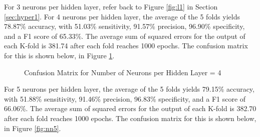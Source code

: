 \documentclass[tikz]{article}
\begin{document}
For 3 neurons per hidden layer, refer back to Figure \ref{fig:l1} in Section \ref{sec:hyper1}. For 4 neurons per hidden layer, the average of the 5 folds yields 78.87\% accuracy, with 51.03\% sensitivity, 91.57\% precision, 96.90\% specificity, and a F1 score of 65.33\%. The average sum of squared errors for the output of each K-fold is 381.74 after each fold reaches 1000 epochs. The confusion matrix for this is shown below, in Figure \ref{fig:nn4}.


\begin{figure}[H]
\begin{center}
\caption{Confusion Matrix for Number of Neurons per Hidden Layer = 4}
\label{fig:nn4}
\end{center}
\end{figure}

For 5 neurons per hidden layer, the average of the 5 folds yields 79.15\% accuracy, with 51.88\% sensitivity, 91.46\% precision, 96.83\% specificity, and a F1 score of 66.06\%. The average sum of squared errors for the output of each K-fold is 382.70 after each fold reaches 1000 epochs. The confusion matrix for this is shown below, in Figure \ref{fig:nn5}.
\end{document}
